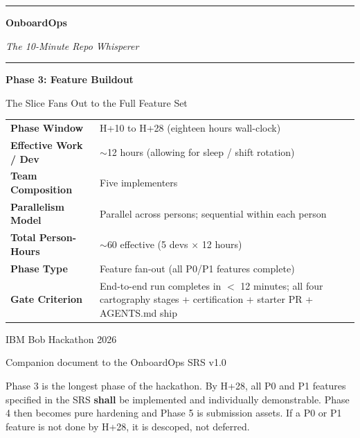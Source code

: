 \documentclass[11pt,letterpaper]{article}
\newcommand{\shall}{\textbf{shall}}
\begin{document}

\begin{titlepage}
\thispagestyle{empty}
\centering
\vspace*{1.5cm}

{\color{ibmblue}\rule{\textwidth}{2pt}}
\vspace{0.8cm}

{\fontsize{38}{46}\selectfont\bfseries\color{ibmblue} OnboardOps\par}
\vspace{0.3cm}
{\Large\itshape\color{ibmgray} The 10-Minute Repo Whisperer\par}
\vspace{0.4cm}

{\color{ibmblue}\rule{\textwidth}{2pt}}
\vspace{2.0cm}

{\huge\bfseries Phase 3: Feature Buildout\par}
\vspace{0.3cm}
{\large The Slice Fans Out to the Full Feature Set\par}
\vspace{2.5cm}

\begin{tabularx}{0.78\textwidth}{lX}
\toprule
\textbf{Phase Window} & H+10 to H+28 (eighteen hours wall-clock) \\
\textbf{Effective Work / Dev} & ${\sim}$12 hours (allowing for sleep / shift rotation) \\
\textbf{Team Composition} & Five implementers \\
\textbf{Parallelism Model} & Parallel across persons; sequential within each person \\
\textbf{Total Person-Hours} & ${\sim}$60 effective (5 devs $\times$ 12 hours) \\
\textbf{Phase Type} & Feature fan-out (all P0/P1 features complete) \\
\textbf{Gate Criterion} & End-to-end run completes in $<$ 12 minutes; all four cartography stages + certification + starter PR + AGENTS.md ship \\
\bottomrule
\end{tabularx}

\vfill

{\large IBM Bob Hackathon 2026\par}
{\normalsize Companion document to the OnboardOps SRS v1.0\par}
\vspace{0.6cm}
{\small\color{ibmgray} Phase 3 is the longest phase of the hackathon. By H+28, all P0 and P1 features specified in the SRS \shall{} be implemented and individually demonstrable. Phase 4 then becomes pure hardening and Phase 5 is submission assets. If a P0 or P1 feature is not done by H+28, it is descoped, not deferred.\par}
\end{titlepage}
\end{document}
